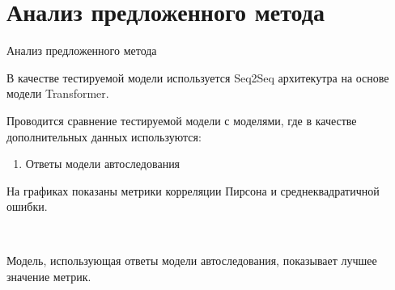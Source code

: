 \documentclass[10pt,pdf,hyperref={unicode}]{beamer}
\begin{document}
\section{Анализ предложенного метода}
\begin{frame}{Анализ предложенного метода}

В качестве тестируемой модели используется Seq2Seq архитекутра на основе модели Transformer.

Проводится сравнение тестируемой модели с моделями, где в качестве дополнительных данных используются:
\begin{enumerate}[1)]
    \item Ответы модели автоследования
\end{enumerate}

На графиках показаны метрики корреляции Пирсона и среднеквадратичной ошибки.

\begin{figure}[h!t]\center
{}
\\
\end{figure}

Модель, использующая ответы модели автоследования, показывает лучшее значение метрик.

\end{frame}

\end{document}
